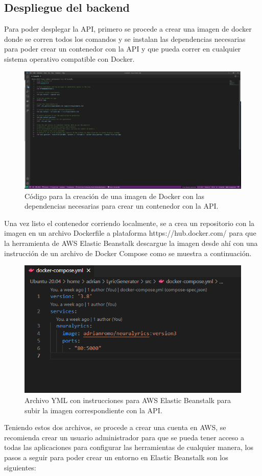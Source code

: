 \documentclass[12pt, a4paper, titlepage]{article}
\begin{document}
	\subsection{Despliegue del backend}
		Para poder desplegar la API, primero se procede a crear una imagen de docker donde se corren todos los comandos y se instalan las dependencias necesarias para poder crear un contenedor con la API y que pueda correr en cualquier sistema operativo compatible con Docker.
		\begin{figure}[H]
			\includegraphics[width=12cm]{./Imagenes/BackEnd/dockerfile.png}
			\centering 
			\caption{Código para la creación de una imagen de Docker con las dependencias necesarias para crear un contenedor con la API.}
		\end{figure}
		Una vez listo el contenedor corriendo localmente, se a crea un repositorio con la imagen en un archivo Dockerfile a plataforma https://hub.docker.com/ para que la herramienta de AWS Elastic Beanstalk descargue la imagen desde ahí con una instrucción de un archivo de Docker Compose como se muestra a continuación.
		\begin{figure}[H]
			\includegraphics[width=12cm]{./Imagenes/BackEnd/dockercompose.png}
			\centering 
			\caption{Archivo YML con instrucciones para AWS Elastic Beanstalk para subir la imagen correspondiente con la API.}
		\end{figure}
		Teniendo estos dos archivos, se procede a crear una cuenta en AWS, se recomienda crear un usuario administrador para que se pueda tener acceso a todas las aplicaciones para configurar las herramientas de cualquier manera, los pasos a seguir para poder crear un entorno en Elastic Beanstalk son los siguientes:
	
\end{document}
